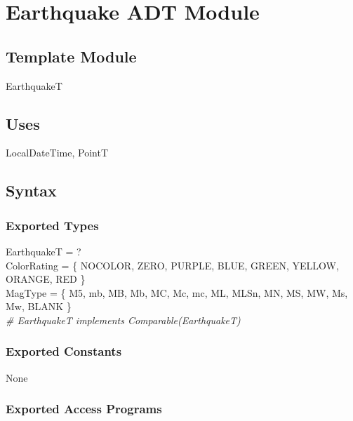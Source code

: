 \documentclass[12pt]{article}
\begin{document}
\newpage

\section* {Earthquake ADT Module}

\subsection* {Template Module}

EarthquakeT

\subsection* {Uses}

LocalDateTime, PointT

\subsection* {Syntax}

\subsubsection* {Exported Types}

EarthquakeT = ?\\

\noindent ColorRating = \{ NOCOLOR, ZERO, PURPLE, BLUE, GREEN, YELLOW, ORANGE, RED \}\\

\noindent MagType = \{ M5, mb, MB, Mb, MC, Mc, mc, ML, MLSn, MN, MS, MW, Ms, Mw, BLANK \}\\

\noindent \textit{\# EarthquakeT implements Comparable(EarthquakeT)}

\subsubsection* {Exported Constants}

None

\subsubsection* {Exported Access Programs}
\end{document}
